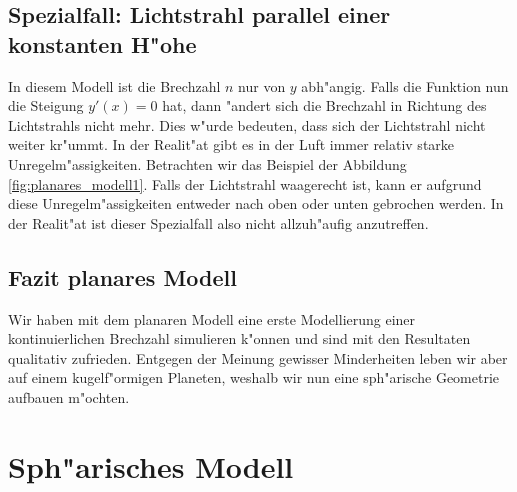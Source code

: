 \begin{refsection}
% 
\subsection{Spezialfall: Lichtstrahl parallel einer konstanten H"ohe \label{ch:spezialfall}}
In diesem Modell ist die Brechzahl $n$ nur von $y$ abh"angig. 
Falls die Funktion nun die Steigung $y'(x) = 0$ hat, dann "andert sich die Brechzahl in Richtung des Lichtstrahls nicht mehr.
Dies w"urde bedeuten, dass sich der Lichtstrahl nicht weiter kr"ummt. 
In der Realit"at gibt es in der Luft immer relativ starke Unregelm"assigkeiten. 
Betrachten wir das Beispiel der Abbildung \ref{fig:planares_modell1}. 
Falls der Lichtstrahl waagerecht ist, kann er aufgrund diese Unregelm"assigkeiten entweder nach oben oder unten gebrochen werden. 
In der Realit"at ist dieser Spezialfall also nicht allzuh"aufig anzutreffen.

\subsection{Fazit planares Modell}
Wir haben mit dem planaren Modell eine erste Modellierung einer kontinuierlichen Brechzahl simulieren k"onnen und sind mit den Resultaten qualitativ zufrieden. 
Entgegen der Meinung gewisser Minderheiten\cite{licht:flatearthsociety} leben wir aber auf einem kugelf"ormigen Planeten, weshalb wir nun eine sph"arische Geometrie aufbauen m"ochten.

\section{Sph"arisches Modell}


\end{refsection}
